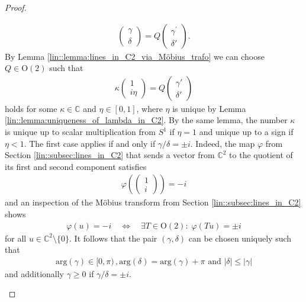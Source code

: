 \documentclass{amsart}
\newcommand{\C}{\mathbb{C}}
\begin{document}
\begin{proof}
\begin{enumerate}[label=(\alph*)]
\begin{align*}
\begin{pmatrix}
                \gamma \\ \delta
            \end{pmatrix}
            =Q
            \begin{pmatrix}
                \gamma^\prime \\ \delta'
            \end{pmatrix}.
        \end{align*}
        By Lemma \ref{lin::lemma:lines_in_C2_via_Möbius_trafo} we can choose $Q \in \mathrm{O}(2)$ such that
        \begin{align*}
            \kappa \begin{pmatrix}
                1 \\ i \eta
            \end{pmatrix}
            =Q
            \begin{pmatrix}
                \gamma' \\ \delta'
            \end{pmatrix}
        \end{align*}
        holds for some $\kappa \in \C$ and $\eta \in [0,1]$, where
        $\eta$ is unique by Lemma \ref{lin::lemma:uniqueness_of_lambda_in_C2}. By the same lemma, the number $\kappa$ is unique up to scalar multiplication from $S^1$ if $\eta=1$ and unique up to a sign if $\eta < 1$. The first case applies if and only if $\gamma/\delta=\pm i$. Indeed, the map $\varphi$ from Section \ref{lin::subsec:lines_in_C2} that sends a vector from $\C^2$ to the quotient of its first and second component satisfies   
        \begin{align*}
            \varphi\left( \begin{pmatrix}
                1 \\ i
            \end{pmatrix} \right) = - i
        \end{align*}
        and an inspection of the Möbius transform from Section \ref{lin::subsec:lines_in_C2} shows
        \begin{align*}
            \varphi(u) = - i
            \quad \Leftrightarrow \quad 
            \exists T \in \mathrm{O}(2): \; \varphi(Tu) = \pm i
        \end{align*}
        for all $u \in \C^2 \setminus \{0\}$.
        It follows that the pair $(\gamma, \delta)$ can be chosen uniquely such that
        \begin{align*}
            \mathrm{arg}(\gamma) \in [0, \pi)\,, \mathrm{arg}(\delta) = \mathrm{arg}(\gamma) + \pi \text{ and } |\delta| \leq |\gamma|
        \end{align*}
        and additionally $\gamma \geq 0$ if $\gamma/\delta= \pm i$.
    \end{enumerate}
\end{proof}
\end{document}
